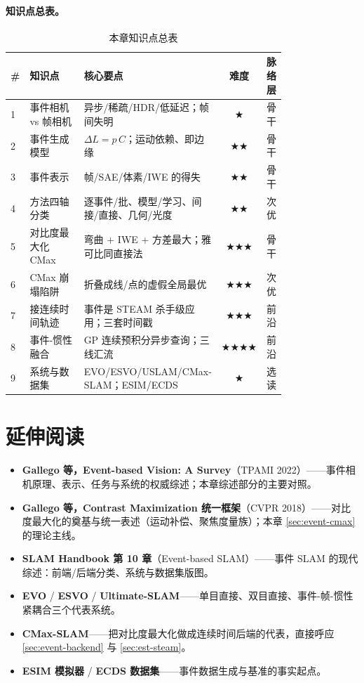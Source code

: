\paragraph{知识点总表。}
\begin{table}[H]\centering\small
\caption{本章知识点总表}
\begin{tabular}{p{0.04\linewidth}p{0.40\linewidth}p{0.34\linewidth}cc}
\toprule
\# & 知识点 & 核心要点 & 难度 & 脉络层 \\
\midrule
1 & 事件相机 vs 帧相机 & 异步/稀疏/HDR/低延迟；帧间失明 & $\bigstar$ & 骨干 \\
2 & 事件生成模型 & $\Delta L=p\,C$；运动依赖、即边缘 & $\bigstar\bigstar$ & 骨干 \\
3 & 事件表示 & 帧/SAE/体素/IWE 的得失 & $\bigstar\bigstar$ & 骨干 \\
4 & 方法四轴分类 & 逐事件/批、模型/学习、间接/直接、几何/光度 & $\bigstar\bigstar$ & 次优 \\
5 & 对比度最大化 CMax & 弯曲 + IWE + 方差最大；雅可比同直接法 & $\bigstar\bigstar\bigstar$ & 骨干 \\
6 & CMax 崩塌陷阱 & 折叠成线/点的虚假全局最优 & $\bigstar\bigstar\bigstar$ & 次优 \\
7 & 接连续时间轨迹 & 事件是 STEAM 杀手级应用；三套时间戳 & $\bigstar\bigstar\bigstar$ & 前沿 \\
8 & 事件-惯性融合 & GP 连续预积分异步查询；三线汇流 & $\bigstar\bigstar\bigstar\bigstar$ & 前沿 \\
9 & 系统与数据集 & EVO/ESVO/USLAM/CMax-SLAM；ESIM/ECDS & $\bigstar$ & 选读 \\
\bottomrule
\end{tabular}
\end{table}

\section*{延伸阅读}
\begin{itemize}
  \item \textbf{Gallego 等，Event-based Vision: A Survey}（TPAMI 2022）\cite{gallego2022eventsurvey}——事件相机原理、表示、任务与系统的权威综述；本章综述部分的主要对照。
  \item \textbf{Gallego 等，Contrast Maximization 统一框架}（CVPR 2018）\cite{gallego2018cmax}——对比度最大化的奠基与统一表述（运动补偿、聚焦度量族）；本章 \cref{sec:event-cmax} 的理论主线。
  \item \textbf{SLAM Handbook 第 10 章}（Event-based SLAM）\cite{carlone2026handbook}——事件 SLAM 的现代综述：前端/后端分类、系统与数据集版图。
  \item \textbf{EVO}\cite{rebecq2017evo} / \textbf{ESVO}\cite{zhou2021esvo} / \textbf{Ultimate-SLAM}\cite{vidal2018ultimate}——单目直接、双目直接、事件-帧-惯性紧耦合三个代表系统。
  \item \textbf{CMax-SLAM}\cite{guo2024cmaxslam}——把对比度最大化做成连续时间后端的代表，直接呼应 \cref{sec:event-backend} 与 \cref{sec:est-steam}。
  \item \textbf{ESIM 模拟器}\cite{rebecq2018esim} / \textbf{ECDS 数据集}\cite{mueggler2017ecds}——事件数据生成与基准的事实起点。
\end{itemize}

